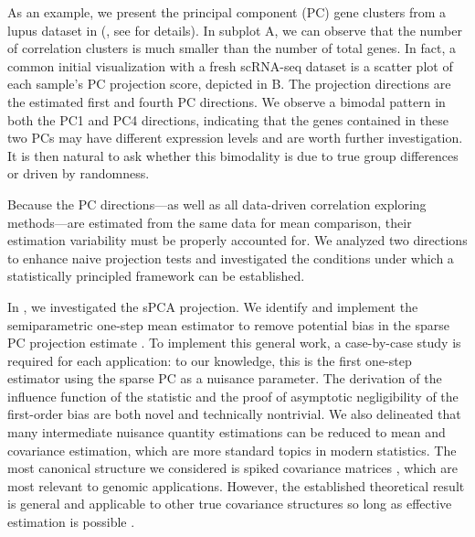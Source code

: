 \documentclass[11pt]{article}
\newenvironment{revblock}
  {\color{teal}}
  {}
\begin{document}
As an example, we present the principal component (PC) gene clusters from a lupus dataset in (, see  for details). In subplot A, we can observe that the number of correlation clusters is much smaller than the number of total genes. In fact, a common initial visualization with a fresh scRNA-seq dataset is a scatter plot of each sample's PC projection score, depicted in B. The projection directions are the estimated first and fourth PC directions. We observe a bimodal pattern in both the PC1 and PC4 directions, indicating that the genes contained in these two PCs may have different expression levels and are worth further investigation. It is then natural to ask whether this bimodality is due to true group differences or driven by randomness. 


Because the PC directions---as well as all data-driven correlation exploring methods---are estimated from the same data for mean comparison, their estimation variability must be properly accounted for. We analyzed two directions to enhance naive projection tests and investigated the conditions under which a statistically principled framework can be established.

\begin{revblock}
In , we investigated the sPCA projection. We identify and implement the semiparametric one-step mean estimator to remove potential bias in the sparse PC projection estimate \citep{bickel1993efficient,cher2018doubleml,kennedy2022semiparametric,hines2022demystifying}. To implement this general work, a case-by-case study is required for each application: to our knowledge, this is the first one-step estimator using the sparse PC as a nuisance parameter. The derivation of the influence function of the statistic and the proof of asymptotic negligibility of the first-order bias are both novel and technically nontrivial. We also delineated that many intermediate nuisance quantity estimations can be reduced to mean and covariance estimation, which are more standard topics in modern statistics. The most canonical structure we considered is spiked covariance matrices \cite{johnstone2001distribution, cai2015optimal}, which are most relevant to genomic applications. However, the established theoretical result is general and applicable to other true covariance structures so long as effective estimation is possible \cite{fan2016overview,cai2016review}.
\end{revblock}
\end{document}
